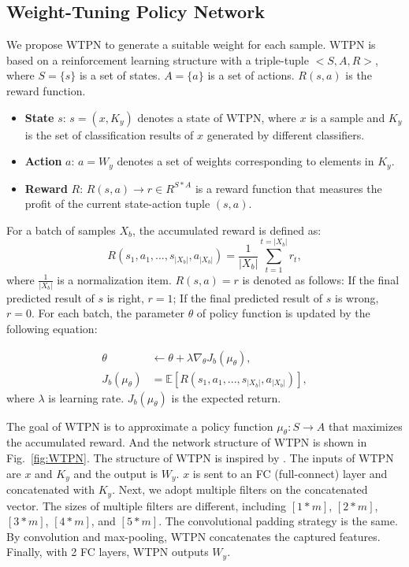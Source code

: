 \subsection{Weight-Tuning Policy Network}
We propose WTPN to generate a suitable weight for each sample. WTPN is based on a reinforcement learning structure with a triple-tuple $<S, A, R>$, where $S = \{ s \}$ is a set of states. $A = \{ a \}$ is a set of actions. $R(s, a)$ is the reward function.
\begin{itemize}
	\item \textbf{State} $s$: $s = ( x, K_y )$ denotes a state of WTPN, where $x$ is a sample and $K_y$ is the set of classification results of $x$ generated by different classifiers.
	
	\item \textbf{Action} $a$: $a = W_y$ denotes a set of weights corresponding to elements in $K_y$.
	
	\item \textbf{Reward} $R$: $R(s, a) \to r \in R^{S * A}$ is a reward function that measures the profit of the current state-action tuple $(s, a)$.
\end{itemize}

For a batch of samples $X_b$, the accumulated reward is defined as:
\begin{equation}
R(s_1, a_1, ..., s_{|X_b|},a_{|X_b|}) = \frac{1}{|X_b|}\sum_{t = 1}^{t = |X_b|} r_t,
\end{equation}
where $ \frac{1}{|X_b|}$ is a normalization item. $R(s,a) = r$ is denoted as follows: If the final predicted result of $s$ is right, $r = 1$; If the final predicted result of $s$ is wrong, $r = 0$.
For each batch, the parameter $\theta$ of policy function is updated by the following equation: 

\begin{align}
\theta &\leftarrow \theta + \lambda \nabla_\theta J_b(\mu_\theta),\\
J_b(\mu_\theta) &= \mathbb{E} [R(s_1, a_1, ..., s_{|X_b|},a_{|X_b|}) ],
\end{align}
where $\lambda$ is learning rate. $J_b(\mu_\theta)$ is the expected return.

The goal of WTPN is to approximate a policy function $\mu_\theta :S \to A$ that maximizes the accumulated reward. And the network structure of WTPN is shown in Fig.~\ref{fig:WTPN}. The structure of WTPN is inspired by \cite{DBLP:conf/aaai/KimJSR16}. The inputs of WTPN are $x$ and $K_y$ and the output is $W_y$. $x$ is sent to an FC (full-connect) layer and concatenated with $K_y$. Next, we adopt multiple filters on the concatenated vector. The sizes of multiple filters are different, including $[1*m]$,  $[2*m]$, $[3*m]$, $[4*m]$, and $[5*m]$. The convolutional padding strategy is the same. By convolution and max-pooling, WTPN concatenates the captured features. Finally, with 2 FC layers, WTPN outputs $W_y$. 

